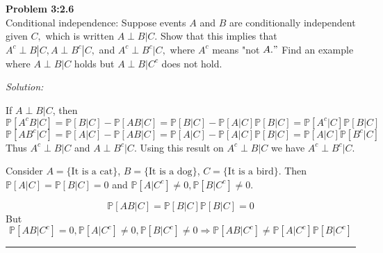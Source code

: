 \documentclass[a4paper, 11pt]{article}
\renewcommand{\P}{\mathbb{P}}
\newenvironment{problem}[2][Problem]
    { \begin{mdframed}[backgroundcolor=gray!20] \textbf{#1 #2} \\}
    {  \end{mdframed}}
\newenvironment{solution}
    {\textit{Solution:}}
    {}
\begin{document}
\begin{problem}{3:2.6}
Conditional independence: Suppose events $A$ and $B$ are conditionally independent given $C,$ which is written $A \perp B | C .$ Show that this implies that $A^{c} \perp B\left|C, A \perp B^{c}\right| C,$ and $A^{c} \perp B^{c} | C,$ where $A^{c}$ means "not $A . "$ Find an example where $A \perp B | C$ holds but $A \perp B | C^{c}$ does not hold.
\end{problem}
\begin{solution}

If $A \perp B | C $, then $$\mathbb{P}\left[A^cB|C\right] = \P\left[B|C\right] - \P\left[AB|C\right]= \P\left[B|C\right] - \P\left[A|C\right]\P\left[B|C\right]=\P\left[A^c|C\right]\P\left[B|C\right]$$
$$\mathbb{P}\left[AB^c|C\right] = \P\left[A|C\right] - \P\left[AB|C\right]= \P\left[A|C\right] - \P\left[A|C\right]\P\left[B|C\right]=\P\left[A|C\right]\P\left[B^c|C\right]$$
Thus $A^c \perp B | C $ and $A \perp B^c | C $. Using this result on $A^c \perp B | C $ we have $A^c \perp B^c | C $.

Consider $A=\{\text{It is a cat}\}$, $B=\{\text{It is a dog}\}$, $C=\{\text{It is a bird}\}$. Then $\P\left[A|C\right]=\P\left[B|C\right]=0$ and $\P\left[A|C^c\right]\neq 0, \P\left[B|C^c\right]\neq0$.

$$\P\left[AB|C\right]=\P\left[B|C\right]\P\left[B|C\right]=0$$
But
$$\P\left[AB|C^c\right]=0, \P\left[A|C^c\right]\neq0,\P\left[B|C^c\right]\neq0 \Longrightarrow \P\left[AB|C^c\right]\neq \P\left[A|C^c\right]\P\left[B|C^c\right]$$


\end{solution} 
\noindent\rule{7in}{2.8pt}
\end{document}
